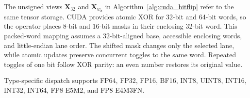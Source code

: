 The unsigned views $\mathbf{X}_{32}$ and $\mathbf{X}_{w_d}$ in Algorithm~\ref{alg:cuda_bitflip} refer to the same tensor storage. CUDA provides atomic XOR for 32-bit and 64-bit words, so the operator places 8-bit and 16-bit masks in their enclosing 32-bit word. This packed-word mapping assumes a 32-bit-aligned base, accessible enclosing words, and little-endian lane order. The shifted mask changes only the selected lane, while atomic updates preserve concurrent toggles to the same word. Repeated toggles of one bit follow XOR parity: an even number restores its original value.

Type-specific dispatch supports FP64, FP32, FP16, BF16, INT8, UINT8, INT16, INT32, INT64, FP8 E5M2, and FP8 E4M3FN.
